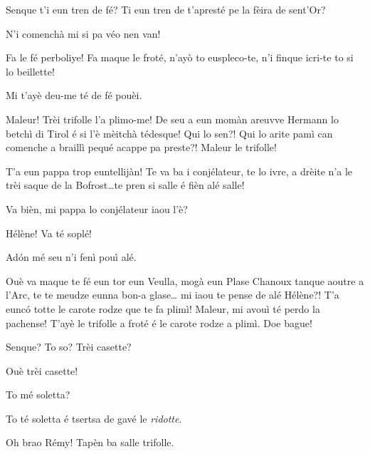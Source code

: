 \begin{drama}
\Cesarspeaks Senque t'i eun tren de fé? Ti eun tren de t'apresté pe la fèira de sent'Or?

\Helenespeaks N'i comenchà mi si pa véo nen van!

\Cesarspeaks{} Fa le fé perboliye! Fa maque le froté, n'ayò to eusple\-co-te, n'i finque icri-te to si lo beillette! 

\Helenespeaks Mi t'ayè deu-me té de fé pouèi.

\Cesarspeaks{} Maleur! Trèi trifolle l'a plimo-me! De seu a eun momàn areuvve Hermann lo betchì di Tirol é si l'è mèi\-tchà tédesque! Qui lo sen?! Qui lo arite pamì can comenche a braillì pequé acappe pa preste?!  Maleur le trifolle!


\Cesarspeaks{} T'a eun pappa trop euntellijàn! Te va ba i conjélateur, te lo ivre, a drèite n'a le trèi saque de la Bofrost\ldots te pren si salle é fièn alé salle!

\Helenespeaks Va bièn, mi pappa lo conjélateur iaou l'è?

\Cesarspeaks{} Hélène! Va té soplé!

 
\Helenespeaks  Ad\'on mé seu n'i fenì pouì alé.

\Cesarspeaks{} Ouè va maque te fé eun tor eun Veulla, mogà eun Plase Chanoux tanque aoutre a l'Arc, te te meudze eunna bon-a glase\ldots {} mi iaou te pense de alé Hélène?! T'a eunc\'o totte le carote rodze que te fa plimì! Maleur, mi avouì té perdo la pachense! T'ayè le trifolle a froté é le carote rodze a plimì. Doe bague!


\Helenespeaks Senque? To so? Trèi casette?

\Cesarspeaks Ouè trèi casette!

\Helenespeaks To mé soletta?

\Cesarspeaks To té soletta é tsertsa de gavé le \textit{ridotte}.


\Cesarspeaks Oh brao Rémy! Tapèn ba salle trifolle.


\end{drama}
